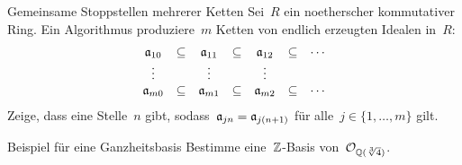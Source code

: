 \documentclass{algblatt}
\begin{document}
\begin{aufgabe}{4}{Gemeinsame Stoppstellen mehrerer Ketten}
Sei~$R$ ein noetherscher kommutativer Ring. Ein Algorithmus produziere~$m$
Ketten von endlich erzeugten Idealen in~$R$:
\[ \begin{array}{@{}ccccccc@{}}
  \aa_{10} &\subseteq& \aa_{11} &\subseteq& \aa_{12} &\subseteq& \cdots \\
  \vdots &         & \vdots &         & \vdots &          \\
  \aa_{m0} &\subseteq& \aa_{m1} &\subseteq& \aa_{m2} &\subseteq& \cdots
\end{array} \]
Zeige, dass eine Stelle~$n$ gibt, sodass~$\aa_{jn} = \aa_{j(n+1)}$ für alle~$j \in
\{ 1,\ldots,m \}$ gilt.
\end{aufgabe}

\begin{aufgabe}{4}{Beispiel für eine Ganzheitsbasis}
Bestimme eine~$\ZZ$-Basis von~$\O_{\QQ(\sqrt[3]{4})}$.
\end{aufgabe}
\end{document}
